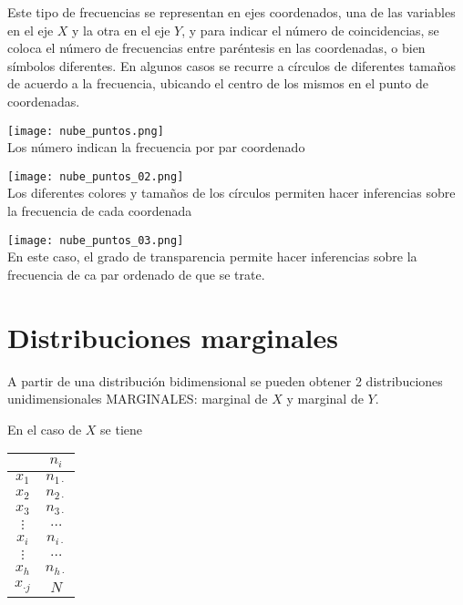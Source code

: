 \documentclass[11 pts, letterpaper, twosided]{article}
\begin{document}
Este tipo de frecuencias se representan en ejes coordenados, una de
las variables en el eje $X$ y la otra en el eje $Y$, y para indicar el
número de coincidencias, se coloca el número de frecuencias entre
paréntesis en las coordenadas, o bien símbolos diferentes. En algunos
casos se recurre a círculos de diferentes tamaños de acuerdo a la
frecuencia, ubicando el centro de los mismos en el punto de
coordenadas.

\begin{center}
    \texttt{[image: nube\_puntos.png]}\\
    Los número indican la frecuencia por par coordenado
\end{center}

\begin{center}
    \texttt{[image: nube\_puntos\_02.png]}\\
    Los diferentes colores y tamaños de los círculos permiten hacer
    inferencias sobre la frecuencia de cada coordenada
\end{center}

\begin{center}
    \texttt{[image: nube\_puntos\_03.png]}\\
    En este caso, el grado de transparencia permite hacer inferencias
    sobre la frecuencia de ca par ordenado de que se trate.
\end{center}

\section{Distribuciones marginales}

A partir de una distribución bidimensional se pueden obtener 2
distribuciones unidimensionales MARGINALES: marginal de $X$ y marginal
de $Y$.

En el caso de $X$ se tiene

\begin{center}
    \begin{tabular}[c]{|c||c|}
      \hline
      \qquad & $n_i$\\
      \hline
      \hline
      $x_1$  & $n_{1\cdot}$\\
      \hline
      $x_2$  & $n_{2\cdot}$\\
      \hline
      $x_3$  & $n_{3\cdot}$\\
      \hline
      $\vdots$ & $\dots$\\
      \hline
      $x_i$  & $n_{i\cdot}$\\
      \hline
      $\vdots$  & $\dots$\\
      \hline
      $x_h$  & $n_{h\cdot}$\\
      \hline
      \hline
      $x_{\cdot j}$  & $N$\\
      \hline
    \end{tabular}
\end{center}
\end{document}
